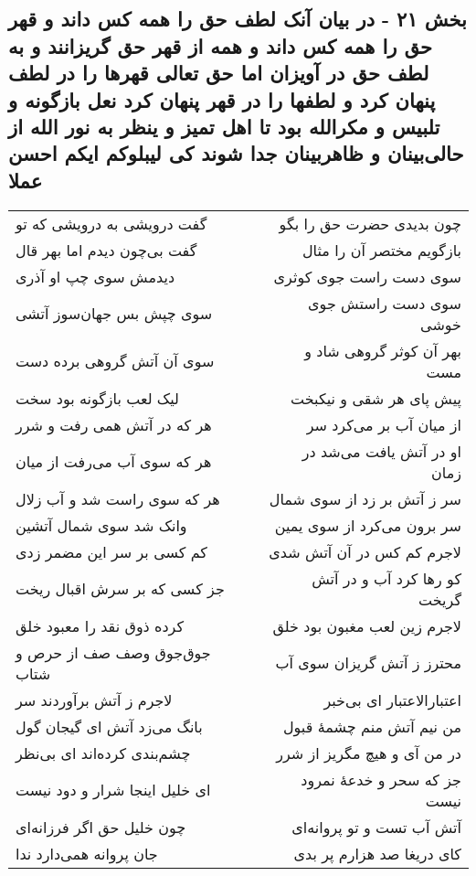 \begin{center}
\section*{بخش ۲۱ - در بیان آنک لطف حق را همه کس داند و قهر حق را همه کس داند و همه از قهر حق گریزانند و به لطف حق در آویزان اما حق تعالی قهرها را در لطف پنهان کرد و لطفها را در قهر پنهان کرد نعل بازگونه و تلبیس و مکرالله بود تا اهل تمیز و ینظر به نور الله از حالی‌بینان و ظاهربینان جدا شوند کی لیبلوکم ایکم احسن عملا}
\label{sec:sh021}
\begin{longtable}{l p{0.5cm} r}
گفت درویشی به درویشی که تو
&&
چون بدیدی حضرت حق را بگو
\\
گفت بی‌چون دیدم اما بهر قال
&&
بازگویم مختصر آن را مثال
\\
دیدمش سوی چپ او آذری
&&
سوی دست راست جوی کوثری
\\
سوی چپش بس جهان‌سوز آتشی
&&
سوی دست راستش جوی خوشی
\\
سوی آن آتش گروهی برده دست
&&
بهر آن کوثر گروهی شاد و مست
\\
لیک لعب بازگونه بود سخت
&&
پیش پای هر شقی و نیکبخت
\\
هر که در آتش همی رفت و شرر
&&
از میان آب بر می‌کرد سر
\\
هر که سوی آب می‌رفت از میان
&&
او در آتش یافت می‌شد در زمان
\\
هر که سوی راست شد و آب زلال
&&
سر ز آتش بر زد از سوی شمال
\\
وانک شد سوی شمال آتشین
&&
سر برون می‌کرد از سوی یمین
\\
کم کسی بر سر این مضمر زدی
&&
لاجرم کم کس در آن آتش شدی
\\
جز کسی که بر سرش اقبال ریخت
&&
کو رها کرد آب و در آتش گریخت
\\
کرده ذوق نقد را معبود خلق
&&
لاجرم زین لعب مغبون بود خلق
\\
جوق‌جوق وصف صف از حرص و شتاب
&&
محترز ز آتش گریزان سوی آب
\\
لاجرم ز آتش برآوردند سر
&&
اعتبارالاعتبار ای بی‌خبر
\\
بانگ می‌زد آتش ای گیجان گول
&&
من نیم آتش منم چشمهٔ قبول
\\
چشم‌بندی کرده‌اند ای بی‌نظر
&&
در من آی و هیچ مگریز از شرر
\\
ای خلیل اینجا شرار و دود نیست
&&
جز که سحر و خدعهٔ نمرود نیست
\\
چون خلیل حق اگر فرزانه‌ای
&&
آتش آب تست و تو پروانه‌ای
\\
جان پروانه همی‌دارد ندا
&&
کای دریغا صد هزارم پر بدی

\end{longtable}
\end{center}
